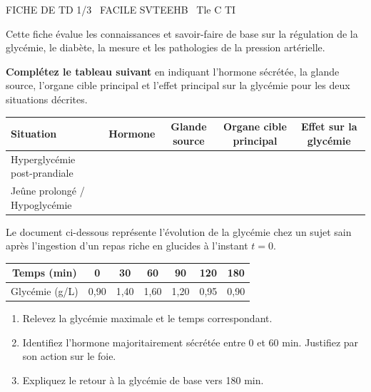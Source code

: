 \documentclass[11pt]{article}
\begin{document}
\begin{tcolorbox}[enhanced,colback=popink,colframe=popink,arc=10pt,boxrule=0pt,left=12pt,right=12pt,top=9pt,bottom=9pt]
{\color{white}\popxbold\small FICHE DE TD 1/3 \textbullet\ FACILE \hfill SVTEEHB \textbullet\ Tle C TI\par}
\end{tcolorbox}
\vspace{4pt}
Cette fiche évalue les connaissances et savoir-faire de base sur la régulation de la glycémie, le diabète, la mesure et les pathologies de la pression artérielle.

\begin{exercice}
\textbf{Complétez le tableau suivant} en indiquant l'hormone sécrétée, la glande source, l'organe cible principal et l'effet principal sur la glycémie pour les deux situations décrites.
\begin{tabularx}{\linewidth}{|X|c|c|c|c|}
\hline
\textbf{Situation} & \textbf{Hormone} & \textbf{Glande source} & \textbf{Organe cible principal} & \textbf{Effet sur la glycémie} \\
\hline
Hyperglycémie post-prandiale & & & & \\
\hline
Jeûne prolongé / Hypoglycémie & & & & \\
\hline
\end{tabularx}
\end{exercice}

\begin{exercice}
Le document ci-dessous représente l'évolution de la glycémie chez un sujet sain après l'ingestion d'un repas riche en glucides à l'instant $t=0$.
\begin{center}
\begin{tabular}{|c|c|c|c|c|c|c|}
\hline
Temps (min) & 0 & 30 & 60 & 90 & 120 & 180 \\
\hline
Glycémie (g/L) & 0,90 & 1,40 & 1,60 & 1,20 & 0,95 & 0,90 \\
\hline
\end{tabular}
\end{center}
\begin{enumerate}
\item Relevez la glycémie maximale et le temps correspondant.
\item Identifiez l'hormone majoritairement sécrétée entre 0 et 60 min. Justifiez par son action sur le foie.
\item Expliquez le retour à la glycémie de base vers 180 min.
\end{enumerate}
\end{exercice}
\end{document}
